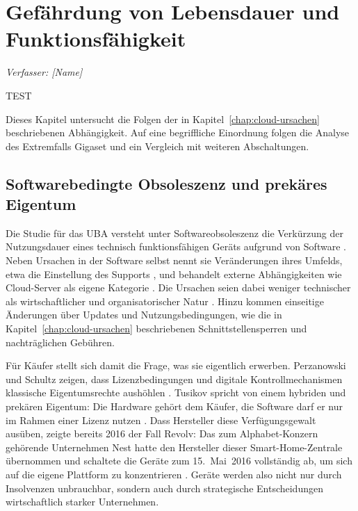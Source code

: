 \chapter{Gefährdung von Lebensdauer und Funktionsfähigkeit}\label{chap:cloud-folgen}
\noindent\textit{Verfasser: [Name]}

TEST

Dieses Kapitel untersucht die Folgen der in Kapitel~\ref{chap:cloud-ursachen}
beschriebenen Abhängigkeit. Auf eine begriffliche Einordnung folgen die
Analyse des Extremfalls Gigaset und ein Vergleich mit weiteren Abschaltungen.

\section{Softwarebedingte Obsoleszenz und prekäres Eigentum}\label{sec:folgen-rahmen}

Die Studie für das \acrshort{UBA} versteht unter Softwareobsoleszenz die
Verkürzung der Nutzungsdauer eines technisch funktionsfähigen Geräts aufgrund
von Software \autocite[vgl.][S.~5]{jaegererben:2023}. Neben Ursachen in der
Software selbst nennt sie Veränderungen ihres Umfelds, etwa die Einstellung
des Supports \autocite[vgl.][S.~32\,f.]{jaegererben:2023}, und behandelt
externe Abhängigkeiten wie Cloud-Server als eigene Kategorie
\autocite[vgl.][S.~151\,ff.]{jaegererben:2023}. Die Ursachen seien dabei
weniger technischer als wirtschaftlicher und organisatorischer Natur
\autocite[vgl.][S.~5]{jaegererben:2023}. Hinzu kommen einseitige Änderungen
über Updates und Nutzungsbedingungen, wie die in Kapitel~\ref{chap:cloud-ursachen}
beschriebenen Schnittstellensperren und nachträglichen Gebühren.

Für Käufer stellt sich damit die Frage, was sie eigentlich erwerben.
Perzanowski und Schultz zeigen, dass Lizenzbedingungen und digitale
Kontrollmechanismen klassische Eigentumsrechte aushöhlen
\autocite[vgl.][]{perzanowski:2016}. Tusikov spricht von einem hybriden und
prekären Eigentum: Die Hardware gehört dem Käufer, die Software darf er nur
im Rahmen einer Lizenz nutzen \autocite[vgl.][S.~11]{tusikov:2019}. Dass
Hersteller diese Verfügungsgewalt ausüben, zeigte bereits 2016 der Fall
Revolv: Das zum Alphabet-Konzern gehörende Unternehmen Nest hatte den
Hersteller dieser Smart-Home-Zentrale übernommen und schaltete die Geräte zum
15.~Mai~2016 vollständig ab, um sich auf die eigene Plattform zu
konzentrieren \autocites[vgl.][]{protalinski:2016}{cullen:2016}. Geräte
werden also nicht nur durch Insolvenzen unbrauchbar, sondern auch durch
strategische Entscheidungen wirtschaftlich starker Unternehmen.

